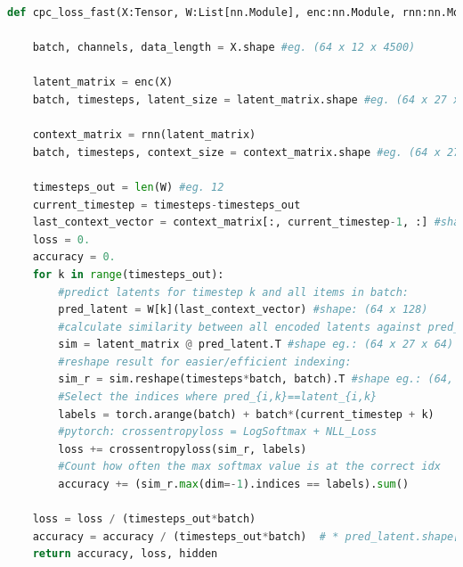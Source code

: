\begin{minipage}{\linewidth}
	\begin{lstlisting}[language=Python, caption=Optimized CPC Loss Pseudo Code. Uses CrossEntropyLoss from Pytorch, label=algo:cpcfast]
def cpc_loss_fast(X:Tensor, W:List[nn.Module], enc:nn.Module, rnn:nn.Module):
	
	batch, channels, data_length = X.shape #eg. (64 x 12 x 4500)
	
	latent_matrix = enc(X)
	batch, timesteps, latent_size = latent_matrix.shape #eg. (64 x 27 x 128)
	
	context_matrix = rnn(latent_matrix)
	batch, timesteps, context_size = context_matrix.shape #eg. (64 x 27 x 256)
	
	timesteps_out = len(W) #eg. 12
	current_timestep = timesteps-timesteps_out
	last_context_vector = context_matrix[:, current_timestep-1, :] #shape: (64 x 256)
	loss = 0.
	accuracy = 0.
	for k in range(timesteps_out):
		#predict latents for timestep k and all items in batch:
		pred_latent = W[k](last_context_vector) #shape: (64 x 128)
		#calculate similarity between all encoded latents against pred_latent:
		sim = latent_matrix @ pred_latent.T #shape eg.: (64 x 27 x 64)
		#reshape result for easier/efficient indexing:
		sim_r = sim.reshape(timesteps*batch, batch).T #shape eg.: (64, 1728)
		#Select the indices where pred_{i,k}==latent_{i,k}
		labels = torch.arange(batch) + batch*(current_timestep + k)
		#pytorch: crossentropyloss = LogSoftmax + NLL_Loss
		loss += crossentropyloss(sim_r, labels)
		#Count how often the max softmax value is at the correct idx
		accuracy += (sim_r.max(dim=-1).indices == labels).sum()
	
	loss = loss / (timesteps_out*batch)
	accuracy = accuracy / (timesteps_out*batch)  # * pred_latent.shape[0]
	return accuracy, loss, hidden
	\end{lstlisting}

\end{minipage}